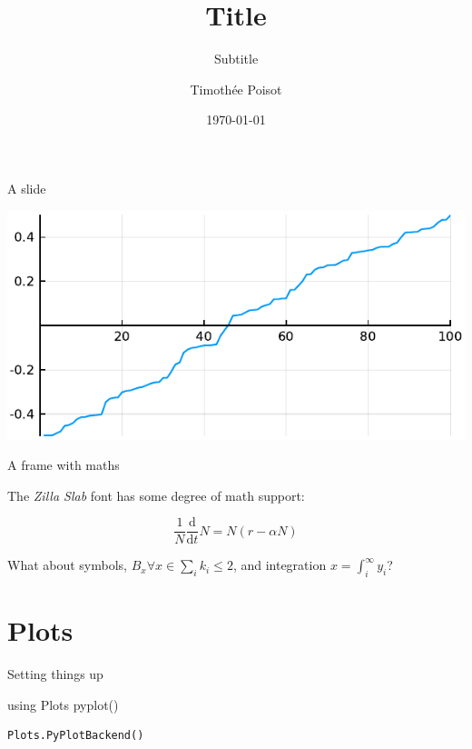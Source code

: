 \documentclass[11pt, compress, aspectratio=1610, serif]{beamer}
\title{Title}
\subtitle{Subtitle}
\date{\today}
\author{Timothée Poisot}
\institute{Université de Montréal}
\newenvironment{Shaded}{}{}
\newcommand{\NormalTok}[1]{{#1}}
\begin{document}
\maketitle

\begin{frame}{A slide}

\includegraphics[width=\textwidth]{figures/density.pdf}

\end{frame}

\begin{frame}{A frame with maths}

The \emph{Zilla Slab} font has some degree of math support:

\[
\frac{1}{N}\frac{\text{d}}{\text{d}t}N = N\left(r-\alpha N\right)
\]

What about symbols, \(B_x \forall x \in \sum_i k_i \leq 2\), and
integration \(x = \int_i^\infty y_i\)?

\end{frame}

\section{Plots}\label{plots}

\begin{frame}[fragile]{Setting things up}

\begin{Shaded}
\begin{Highlighting}[]
\NormalTok{using Plots}
\NormalTok{pyplot()}
\end{Highlighting}
\end{Shaded}

\begin{verbatim}
Plots.PyPlotBackend()
\end{verbatim}

\end{frame}
\end{document}

